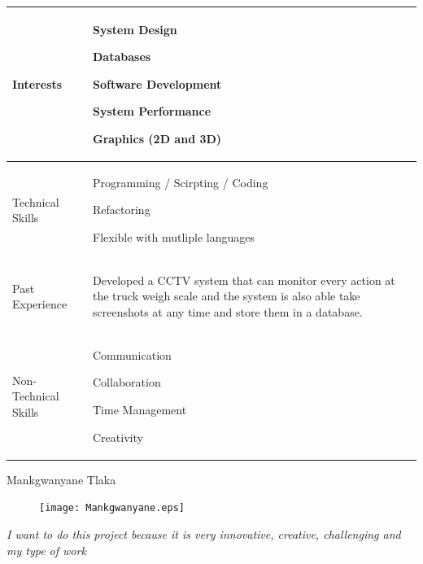 \documentclass{article}
\begin{document}
\begin{center}
\begin{tabularx}{1.0\textwidth}{|p{3cm}|X|}
\hline
 {\LARGE Interests} & 
 \begin{compactitem}
     \item {\large System Design}
     \item {\large Databases}
     \item {\large Software Development}
	 \item {\large System Performance}
	 \item {\large Graphics (2D and 3D)}
 \end{compactitem} \\ 
 \hline
 {\LARGE Technical Skills} & 
 \begin{compactitem}
     \item {\large Programming / Scirpting / Coding} 
     \item {\large Refactoring}
     \item {\large Flexible with mutliple languages}
 \end{compactitem} \\ 
 \hline
 {\LARGE Past Experience} & 
 \begin{compactitem}
     \item {\large Developed a CCTV system that can monitor every action at the truck weigh scale and the system is also able take screenshots at any time and store them in a database.}
 \end{compactitem} \\ 
 \hline
 {\LARGE Non-Technical Skills} & 
 \begin{compactitem}
     \item {\large Communication}
     \item {\large Collaboration}
	 \item {\large Time Management}
	 \item {\large Creativity}
 \end{compactitem} \\
 \hline 
\end{tabularx}
\end{center}
\pagebreak
{\huge Mankgwanyane Tlaka}
\begin{figure}[h]
\centering
\texttt{[image: Mankgwanyane.eps]} 
\end{figure}

 	\textit{I want to do this project because it is very innovative, creative, challenging and my type of work}
\end{document}
